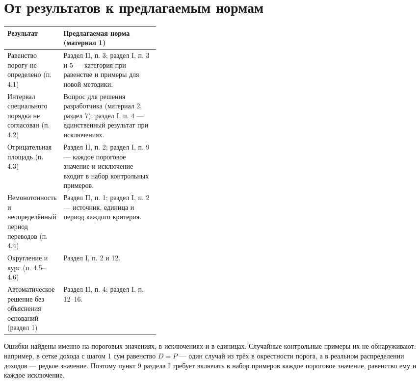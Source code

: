 \documentclass[12pt,a4paper]{extarticle}
\begin{document}
\section{От результатов к предлагаемым нормам}
\begingroup\fontsize{12bp}{14.4bp}\selectfont
\begin{longtable}{L{0.36\linewidth} L{\tabcolsep}}
\toprule
Результат & Предлагаемая норма (материал 1)\\\midrule\endhead
Равенство порогу не определено (п. 4.1) & Раздел II, п. 3; раздел I, п. 3 и 5 — категория при равенстве и примеры для новой методики.\\\midrule
Интервал специального порядка не согласован (п. 4.2) & Вопрос для решения разработчика (материал 2, раздел 7); раздел I, п. 4 — единственный результат при исключениях.\\\midrule
Отрицательная площадь (п. 4.3) & Раздел II, п. 2; раздел I, п. 9 — каждое пороговое значение и исключение входит в набор контрольных примеров.\\\midrule
Немонотонность и неопределённый период переводов (п. 4.4) & Раздел II, п. 1; раздел I, п. 2 — источник, единица и период каждого критерия.\\\midrule
Округление и курс (п. 4.5–4.6) & Раздел I, п. 2 и 12.\\\midrule
Автоматическое решение без объяснения оснований (раздел 1) & Раздел II, п. 4; раздел I, п. 12–16.\\
\bottomrule
\end{longtable}\endgroup

Ошибки найдены именно на пороговых значениях, в исключениях и в единицах. Случайные контрольные примеры их не обнаруживают: например, в сетке дохода с шагом 1 сум равенство $D=P$ — один случай из трёх в окрестности порога, а в реальном распределении доходов — редкое значение. Поэтому пункт 9 раздела I требует включать в набор примеров каждое пороговое значение, равенство ему и каждое исключение.
\end{document}
